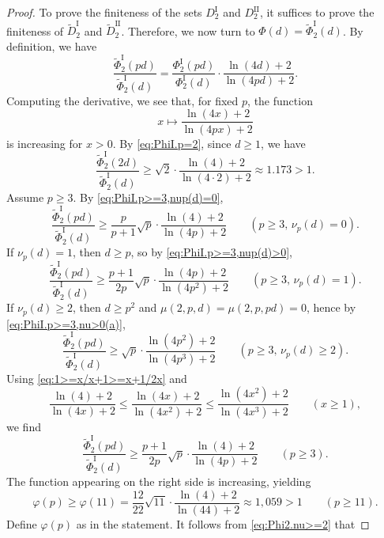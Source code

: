 \documentclass[a4paper]{amsart}
\theoremstyle{definition}
\theoremstyle{plain}
\newcommand{\I}{\mathrm{I}}
\newcommand{\II}{\mathrm{II}}
\begin{document}
\begin{proof}
    To prove the finiteness of the sets \(D_2^\I\) and \(D_2^\II\), it suffices to prove the finiteness of \(\tilde D_2^\I\) and \(\tilde D_2^\II\). Therefore, we now turn to \(\Phi(d) = \tilde{\Phi}_2^\I(d)\). By definition, we have
    \[
        \frac{\tilde{\Phi}_2^\I(pd)}{\tilde{\Phi}_2^\I(d)} 
        = \frac{\Phi_2^\I(pd)}{\Phi_2^\I(d)} \cdot \frac{\ln(4d)+2}{\ln(4pd)+2}.
    \]
    Computing the derivative, we see that, for fixed \(p\), the function
    \[
        x \longmapsto \frac{\ln(4x)+2}{\ln(4px)+2}
    \]
    is increasing for \(x > 0\). By \eqref{eq:PhiI.p=2}, since \(d \geq 1\), we have
    \[
        \frac{\tilde{\Phi}_2^\I(2d)}{\tilde{\Phi}_2^\I(d)} \geq \sqrt{2} \cdot \frac{\ln(4)+2}{\ln(4\cdot 2)+2} \approx 1.173 >1.
    \]
    Assume \(p \geq 3\). By \eqref{eq:PhiI.p>=3,nup(d)=0},
    \begin{equation} \label{eq:Phi2.nu=0}
        \frac{\tilde{\Phi}_2^\I(pd)}{\tilde{\Phi}_2^\I(d)} \geq \frac{p}{p+1}\sqrt{p} \cdot \frac{\ln(4)+2}{\ln(4p)+2} \qquad (p \geq 3,\,\nu_p(d) = 0).
    \end{equation}
    If \(\nu_p(d) =1\), then \(d \geq p\), so by \eqref{eq:PhiI.p>=3,nup(d)>0},
    \begin{equation} \label{eq:Phi2.nu=1}
        \frac{\tilde{\Phi}_2^\I(pd)}{\tilde{\Phi}_2^\I(d)} \geq \frac{p+1}{2p} \sqrt{p} \cdot \frac{\ln(4p)+2}{\ln(4p^2)+2} \qquad (p \geq 3,\,\nu_p(d) = 1).
    \end{equation}
    If \(\nu_p(d) \geq 2\), then \(d \geq p^2\) and \(\mu(2,p,d) = \mu(2,p,pd) = 0\), hence by \eqref{eq:PhiI.p>=3,nu>0(a)},
    \begin{equation} \label{eq:Phi2.nu>=2}
        \frac{\tilde{\Phi}_2^\I(pd)}{\tilde{\Phi}_2^\I(d)} \geq \sqrt{p} \cdot \frac{\ln(4p^2)+2}{\ln(4 p^3)+2} \qquad (p \geq3, \, \nu_p(d) \geq 2).
    \end{equation}
    Using \eqref{eq:1>=x/x+1>=x+1/2x} and
    \[
        \frac{\ln(4)+2}{\ln(4x)+2} \leq \frac{\ln(4x)+2}{\ln(4x^2)+2} \leq \frac{\ln(4x^2)+2}{\ln(4x^3)+2} \qquad (x \geq 1),
    \]
    we find 
    \begin{equation*} \label{eq:Phi2.p>=3}
        \frac{\tilde{\Phi}_2^\I(pd)}{\tilde{\Phi}_2^\I(d)} \geq \frac{p+1}{2p} \sqrt{p} \cdot \frac{\ln(4)+2}{\ln(4p)+2} \qquad (p \geq 3).
    \end{equation*}
    The function appearing on the right side is increasing, yielding
    \[
        \varphi(p) \geq \varphi(11) = \frac{12}{22} \sqrt{11}\cdot \frac{\ln(4)+2}{\ln(44)+2} \approx 1,059 > 1 \qquad (p \geq 11). 
    \]
    Define \(\varphi(p)\) as in the statement. It follows from \eqref{eq:Phi2.nu>=2} that

\end{proof}
\end{document}
